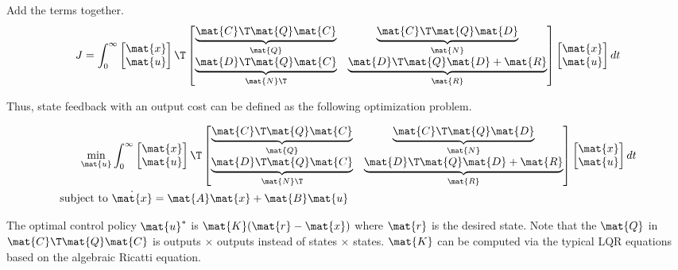 Add the terms together.
\begin{equation}
  J = \int_0^\infty
  \begin{bmatrix}
    \mat{x} \\
    \mat{u}
  \end{bmatrix}\T
  \begin{bmatrix}
    \underbrace{\mat{C}\T\mat{Q}\mat{C}}_{\mat{Q}} &
    \underbrace{\mat{C}\T\mat{Q}\mat{D}}_{\mat{N}} \\
    \underbrace{\mat{D}\T\mat{Q}\mat{C}}_{\mat{N}\T} &
    \underbrace{\mat{D}\T\mat{Q}\mat{D} + \mat{R}}_{\mat{R}}
  \end{bmatrix}
  \begin{bmatrix}
    \mat{x} \\
    \mat{u}
  \end{bmatrix}
  dt
\end{equation}

Thus, state feedback with an output cost can be defined as the following
optimization problem.
\begin{theorem}
  \begin{align}
    \min_{\mat{u}} &\int_0^\infty
    \begin{bmatrix}
      \mat{x} \\
      \mat{u}
    \end{bmatrix}\T
    \begin{bmatrix}
      \underbrace{\mat{C}\T\mat{Q}\mat{C}}_{\mat{Q}} &
      \underbrace{\mat{C}\T\mat{Q}\mat{D}}_{\mat{N}} \\
      \underbrace{\mat{D}\T\mat{Q}\mat{C}}_{\mat{N}\T} &
      \underbrace{\mat{D}\T\mat{Q}\mat{D} + \mat{R}}_{\mat{R}}
    \end{bmatrix}
    \begin{bmatrix}
      \mat{x} \\
      \mat{u}
    \end{bmatrix}
    dt \nonumber \\
    \text{subject to } &\dot{\mat{x}} = \mat{A}\mat{x} + \mat{B}\mat{u}
  \end{align}

  The optimal control policy $\mat{u}^*$ is $\mat{K}(\mat{r} - \mat{x})$ where
  $\mat{r}$ is the desired state. Note that the $\mat{Q}$ in
  $\mat{C}\T\mat{Q}\mat{C}$ is outputs $\times$ outputs instead of states
  $\times$ states. $\mat{K}$ can be computed via the typical LQR equations based
  on the algebraic Ricatti equation.
\end{theorem}


